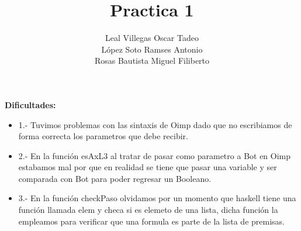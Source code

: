 \documentclass{article}
\title{Practica 1}
\author{Leal Villegas Oscar Tadeo \\ López Soto Ramses Antonio \\Rosas Bautista Miguel Filiberto}
\begin{document}
	
	\maketitle
	\textbf{Dificultades:}
	\begin{itemize}
		\item 1.- Tuvimos problemas con las sintaxis de Oimp dado que no escribiamos de forma correcta los parametros que debe recibir.
		\item 2.- En la función esAxL3 al tratar de pasar como parametro a Bot en Oimp estabamos mal por que en realidad se tiene que pasar una variable y ser comparada con Bot para poder regresar un Booleano.
		\item 3.- En la función checkPaso olvidamos por un momento que haskell tiene una función llamada elem y checa si es elemeto de una lista, dicha función la empleamos para verificar que una formula es parte de la lista de premisas.
	\end{itemize}
\end{document}
